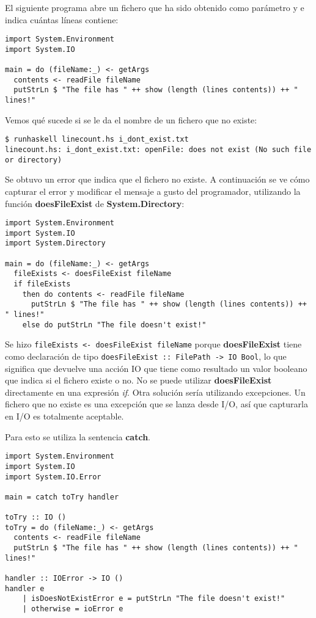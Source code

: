 El siguiente programa abre un fichero que ha sido obtenido como parámetro y e indica cuántas líneas contiene:

\begin{lstlisting}
import System.Environment
import System.IO

main = do (fileName:_) <- getArgs
  contents <- readFile fileName
  putStrLn $ "The file has " ++ show (length (lines contents)) ++ " lines!"
\end{lstlisting}

Vemos qué sucede si se le da el nombre de un fichero que no existe:

\begin{lstlisting}
$ runhaskell linecount.hs i_dont_exist.txt
linecount.hs: i_dont_exist.txt: openFile: does not exist (No such file or directory)
\end{lstlisting}

Se obtuvo un error que indica que el fichero no existe. A continuación se ve cómo capturar el error y modificar el mensaje a gusto del programador, utilizando la función \textbf{doesFileExist} de \textbf{System.Directory}:

\begin{lstlisting}
import System.Environment
import System.IO
import System.Directory

main = do (fileName:_) <- getArgs
  fileExists <- doesFileExist fileName
  if fileExists
    then do contents <- readFile fileName
      putStrLn $ "The file has " ++ show (length (lines contents)) ++ " lines!"
    else do putStrLn "The file doesn't exist!"
\end{lstlisting}

Se hizo \lstinline$fileExists <- doesFileExist fileName$ porque \textbf{doesFileExist} tiene como declaración de tipo \lstinline$doesFileExist :: FilePath -> IO Bool$, lo que significa que devuelve una acción IO que tiene como resultado un valor booleano que indica si el fichero existe o no. No se puede utilizar \textbf{doesFileExist} directamente en una expresión \textit{if}.
Otra solución sería utilizando excepciones. Un fichero que no existe es una excepción que se lanza desde I/O, así que capturarla en I/O es totalmente aceptable.

Para esto se utiliza la sentencia \textbf{catch}.

\begin{lstlisting}
import System.Environment
import System.IO
import System.IO.Error

main = catch toTry handler

toTry :: IO ()
toTry = do (fileName:_) <- getArgs
  contents <- readFile fileName
  putStrLn $ "The file has " ++ show (length (lines contents)) ++ " lines!"

handler :: IOError -> IO ()
handler e
    | isDoesNotExistError e = putStrLn "The file doesn't exist!"
    | otherwise = ioError e
\end{lstlisting}

